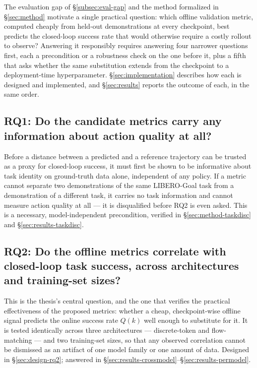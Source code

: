 \documentclass[english,12pt,a4paper,pdftex,elec,utf8]{aaltothesis}
\begin{document}
The evaluation gap of \S\ref{subsec:eval-gap} and the method formalized in \S\ref{sec:method} motivate a single practical question: which offline validation metric, computed cheaply from held-out demonstrations at every checkpoint, best predicts the closed-loop success rate that would otherwise require a costly rollout to observe? Answering it responsibly requires answering four narrower questions first, each a precondition or a robustness check on the one before it, plus a fifth that asks whether the same substitution extends from the checkpoint to a deployment-time hyperparameter. \S\ref{sec:implementation} describes how each is designed and implemented, and \S\ref{sec:results} reports the outcome of each, in the same order.

\subsection{RQ1: Do the candidate metrics carry any information about action quality at all?}
\label{sec:rq1}

Before a distance between a predicted and a reference trajectory can be trusted as a proxy for closed-loop success, it must first be shown to be informative about task identity on ground-truth data alone, independent of any policy. If a metric cannot separate two demonstrations of the same LIBERO-Goal task from a demonstration of a different task, it carries no task information and cannot measure action quality at all --- it is disqualified before RQ2 is even asked. This is a necessary, model-independent precondition, verified in \S\ref{sec:method-taskdisc} and \S\ref{sec:results-taskdisc}.

\subsection{RQ2: Do the offline metrics correlate with closed-loop task success, across architectures and training-set sizes?}
\label{sec:rq2}

This is the thesis's central question, and the one that verifies the practical effectiveness of the proposed metrics: whether a cheap, checkpoint-wise offline signal predicts the online success rate $Q(k)$ well enough to substitute for it. It is tested identically across three architectures --- discrete-token and flow-matching --- and two training-set sizes, so that any observed correlation cannot be dismissed as an artifact of one model family or one amount of data. Designed in \S\ref{sec:design-rq2}; answered in \S\ref{sec:results-crossmodel}--\S\ref{sec:results-permodel}.
\end{document}
